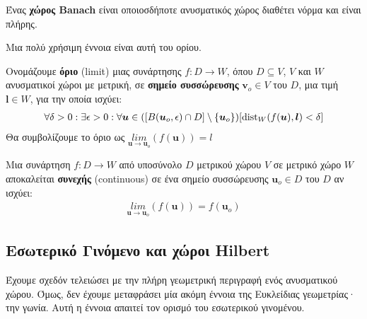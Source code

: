 \documentclass[main.tex]{subfiles}
\begin{document}
	\begin{definition}
		Ένας \textbf{χώρος Banach} είναι οποιοσδήποτε ανυσματικός χώρος διαθέτει νόρμα και είναι πλήρης.
	\end{definition}
	
	Μια πολύ χρήσιμη έννοια είναι αυτή του ορίου.
	\begin{definition}
		Ονομάζουμε \textbf{όριο} (limit) μιας συνάρτησης ${f:D\rightarrow W}$, όπου ${D\subseteq V}$, $V$ και $W$ ανυσματικοί χώροι με μετρική, σε \textbf{σημείο συσσώρευσης} ${\boldsymbol{v}_o\in V}$ του $D$, μια τιμή ${\boldsymbol{l}\in W}$, για την οποία ισχύει:
		\begin{align*}
			\forall\delta >0:\exists \epsilon >0 : \forall \boldsymbol{u}\in ([B(\boldsymbol{u}_o,\epsilon)\cap D]\setminus\{\boldsymbol{u}_o\})[\operatorname{dist}_W(f(\boldsymbol{u}),\boldsymbol{l}) < \delta]
		\end{align*}
		Θα συμβολίζουμε το όριο ως $\underset{\boldsymbol{u} \rightarrow \boldsymbol{u}_o}{lim}(f(\boldsymbol{u})) = l$
	\end{definition}
	
	\begin{definition}
		Μια συνάρτηση ${f:D\rightarrow W}$ από υποσύνολο $D$ μετρικού χώρου $V$ σε μετρικό χώρο $W$ αποκαλείται \textbf{συνεχής} (continuous) σε ένα σημείο συσσώρευσης $\boldsymbol{u}_o\in D$ του $D$ αν ισχύει:
		\begin{align*}
			\underset{\boldsymbol{u} \rightarrow \boldsymbol{u}_o}{lim}(f(\boldsymbol{u})) = f(\boldsymbol{u}_o)
		\end{align*}
	\end{definition}
	\newpage
	\subsection{Εσωτερικό Γινόμενο και χώροι Hilbert}
	Έχουμε σχεδόν τελειώσει με την πλήρη γεωμετρική περιγραφή ενός ανυσματικού χώρου. Όμως, δεν έχουμε μεταφράσει μία ακόμη έννοια της Ευκλείδιας γεωμετρίας· την γωνία. Αυτή η έννοια απαιτεί τον ορισμό του εσωτερικού γινομένου.
	
\end{document}
